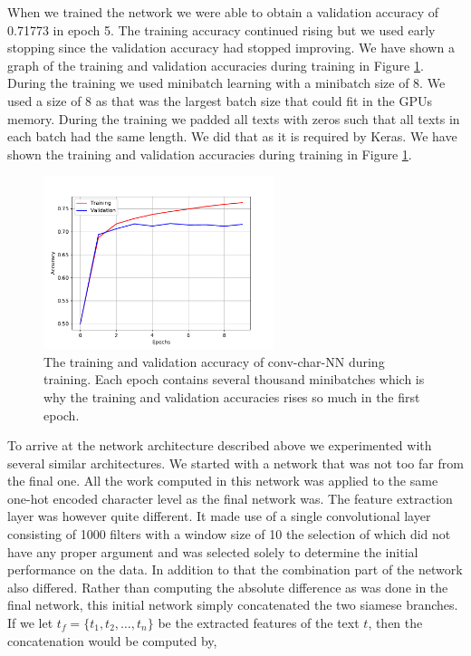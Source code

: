 When we trained the network we were able to obtain a validation accuracy of
0.71773 in epoch 5. The training accuracy continued rising but we used early
stopping since the validation accuracy had stopped improving. We have shown
a graph of the training and validation accuracies during training in Figure
\ref{fig:conv-char-NN-accuracies}. During the training we used minibatch
learning with a minibatch size of 8. We used a size of 8 as that was the largest
batch size that could fit in the GPUs memory. During the training we padded
all texts with zeros such that all texts in each batch had the same length. We
did that as it is required by Keras. We have shown the training and validation
accuracies during training in Figure \ref{fig:conv-char-NN-accuracies}.

\begin{figure}
    \centering
    \includegraphics[width=0.6\textwidth]{./pictures/experiments/conv_char_nn/training_accuracy}
    \caption{The training and validation accuracy of \gls{conv-char-NN} during
        training. Each epoch contains several thousand minibatches which is why
        the training and validation accuracies rises so much in the first
        epoch.}
    \label{fig:conv-char-NN-accuracies}
\end{figure}

To arrive at the network architecture described above we experimented with
several similar architectures. We started with a network that was not too
far from the final one. All the work computed in this network was applied
to the same one-hot encoded character level as the final network was. The
feature extraction layer was however quite different. It made use of a single
convolutional layer consisting of 1000 filters with a window size of 10 the
selection of which did not have any proper argument and was selected solely
to determine the initial performance on the data. In addition to that the
combination part of the network also differed. Rather than computing the
absolute difference as was done in the final network, this initial network
simply concatenated the two siamese branches. If we let $t_f = \{t_1, t_2,
\dots, t_n\}$ be the extracted features of the text $t$, then the concatenation
would be computed by,

